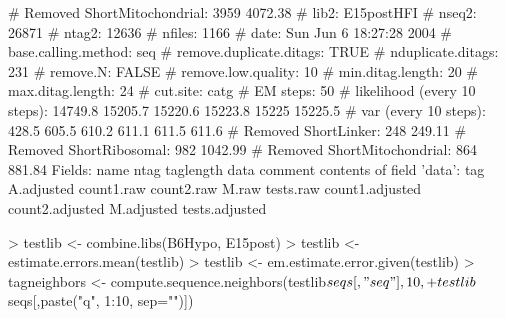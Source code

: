 \documentclass[12pt]{article}
\begin{document}
\begin{Schunk}
\begin{Soutput}
# Removed ShortMitochondrial: 3959 4072.38
# lib2: E15postHFI
# nseq2: 26871
# ntag2: 12636
# nfiles: 1166
# date: Sun Jun  6 18:27:28 2004
# base.calling.method: seq
# remove.duplicate.ditags: TRUE
# nduplicate.ditags: 231
# remove.N: FALSE
# remove.low.quality: 10
# min.ditag.length: 20
# max.ditag.length: 24
# cut.site: catg
# EM steps: 50
# likelihood (every 10 steps): 14749.8 15205.7 15220.6 15223.8 15225 15225.5
# var (every 10 steps): 428.5 605.5 610.2 611.1 611.5 611.6
# Removed ShortLinker: 248 249.11
# Removed ShortRibosomal: 982 1042.99
# Removed ShortMitochondrial: 864 881.84
Fields:
name ntag taglength data comment
contents of field 'data':
tag A.adjusted count1.raw count2.raw M.raw tests.raw count1.adjusted count2.adjusted M.adjusted tests.adjusted
\end{Soutput}
\end{Schunk}

\begin{Schunk}
\begin{Sinput}
> testlib <- combine.libs(B6Hypo, E15post)
> testlib <- estimate.errors.mean(testlib)
> testlib <- em.estimate.error.given(testlib)
> tagneighbors <- compute.sequence.neighbors(testlib$seqs[,"seq"], 10,
+                          testlib$seqs[,paste("q", 1:10, sep="")])
\end{Sinput}
\end{Schunk}
\end{document}
